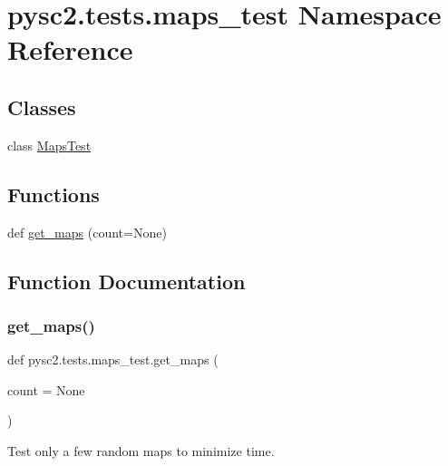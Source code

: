 \hypertarget{namespacepysc2_1_1tests_1_1maps__test}{}\section{pysc2.\+tests.\+maps\+\_\+test Namespace Reference}
\label{namespacepysc2_1_1tests_1_1maps__test}
\subsection*{Classes}
\begin{DoxyCompactItemize}
\item 
class \mbox{\hyperlink{classpysc2_1_1tests_1_1maps__test_1_1_maps_test}{Maps\+Test}}
\end{DoxyCompactItemize}
\subsection*{Functions}
\begin{DoxyCompactItemize}
\item 
def \mbox{\hyperlink{namespacepysc2_1_1tests_1_1maps__test_a0304381d3a6f931db42f939142620ba1}{get\+\_\+maps}} (count=None)
\end{DoxyCompactItemize}


\subsection{Function Documentation}
\mbox{\label{namespacepysc2_1_1tests_1_1maps__test_a0304381d3a6f931db42f939142620ba1}} 
\subsubsection{\texorpdfstring{get\+\_\+maps()}{get\_maps()}}
{\footnotesize\ttfamily def pysc2.\+tests.\+maps\+\_\+test.\+get\+\_\+maps (\begin{DoxyParamCaption}\item[{}]{count = {\ttfamily None} }\end{DoxyParamCaption})}

\begin{DoxyVerb}Test only a few random maps to minimize time.\end{DoxyVerb}
 
